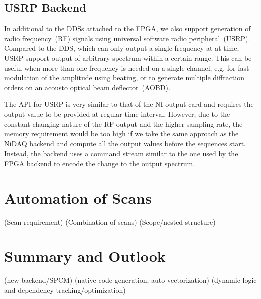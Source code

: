 \subsection{USRP Backend}
\label{ch:computer-control:backend:usrp}

In additional to the DDSs attached to the FPGA, we also support generation of
radio frequency~(RF) signals using universal software radio peripheral~(USRP).
Compared to the DDS, which can only output a single frequency at at time,
USRP support output of arbitrary spectrum within a certain range.
This can be useful when more than one frequency is needed on a single channel,
e.g. for fast modulation of the amplitude using beating,
or to generate multiple diffraction orders on an acousto optical beam deflector~(AOBD).


The API for USRP is very similar to that of the NI output card
and requires the output value to be provided at regular time interval.
However, due to the constant changing nature of the RF output and the higher sampling rate,
the memory requirement would be too high if we take the same approach as the NiDAQ backend
and compute all the output values before the sequences start.
Instead, the backend uses a command stream similar to the one used by the FPGA backend
to encode the change to the output spectrum.


\section{Automation of Scans}
\label{ch:computer-control:scan}

(Scan requirement)
(Combination of scans)
(Scope/nested structure)

\section{Summary and Outlook}
\label{ch:computer-control:summary}
(new backend/SPCM)
(native code generation, auto vectorization)
(dynamic logic and dependency tracking/optimization)
